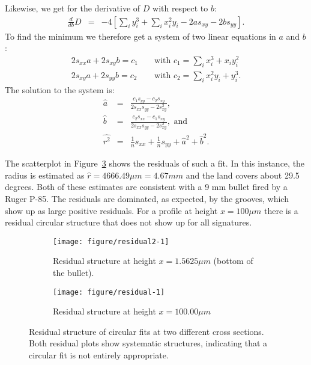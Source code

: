 \documentclass[aoas]{imsart}\usepackage[]{graphicx}\usepackage[]{color}
\newenvironment{knitrout}{}{} %
\begin{document}
\noindent
Likewise, we get for the derivative of $D$ with respect to $b$:
\begin{eqnarray*}
\frac{d}{db} D &=& -4 \left[ \sum_i y_i^3   + \sum_i x_i^2 y_i - 2a s_{xy} - 2b s_{yy} \right].
\end{eqnarray*}
To find the minimum we therefore get a system of two linear equations in $a$ and $b$:
\begin{eqnarray*}
2 s_{xx} a + 2 s_{xy} b = c_1 && \text{ with } c_1 = \sum_i x_i^3 + x_i y_i^2 \\
2 s_{xy} a + 2 s_{yy} b = c_2 &&\text{ with } c_2 = \sum_i x_i^2 y_i + y_i^3.
\end{eqnarray*}
The solution to the system is:
\begin{eqnarray*}
\hat{a} &=& \frac{c_1 s_{yy} - c_2 s_{xy}}{2 s_{xx} s_{yy} - 2 s_{xy}^2},\\
\hat{b} &=& \frac{c_2 s_{xx} - c_1 s_{xy}}{2 s_{xx} s_{yy} - 2 s_{xy}^2}, \text{ and}\\
\hat{r^2} &=& \frac{1}{n}s_{xx} + \frac{1}{n}s_{yy} + \hat{a}^2 + \hat{b}^2.
\end{eqnarray*}


The scatterplot in Figure~\ref{fig:residual} shows the residuals of such a fit.
In this instance, the radius is estimated as $\hat{r} = 4666.49\mu m = 4.67mm$ and the land covers about 29.5 degrees.  Both of these estimates are consistent with a 9 mm bullet fired by a Ruger P-85.
The residuals are dominated, as expected, by the grooves, which show up as large positive residuals. For a profile at height $x = 100\mu m$ there is a residual circular structure that does not show up for all signatures. 

\begin{figure}[hbtp]
  \centering
\begin{subfigure}[b]{.49\textwidth}\centering
\caption{\label{fig:residuala}Residual structure at height $x = 1.5625\mu m$ (bottom of the bullet).}
\begin{knitrout}
\color{fgcolor}
\texttt{[image: figure/residual2-1]} 

\end{knitrout}
\end{subfigure}    
\begin{subfigure}[b]{.49\textwidth}\centering
\caption{\label{fig:residualb} Residual structure at height $x = 100.00\mu m$}
\begin{knitrout}
\color{fgcolor}
\texttt{[image: figure/residual-1]} 

\end{knitrout}
\end{subfigure}
\caption{\label{fig:residual} Residual structure of circular fits at two different cross sections. Both residual plots show systematic structures, indicating that a circular fit is not entirely appropriate.}
\end{figure}
\end{document}
